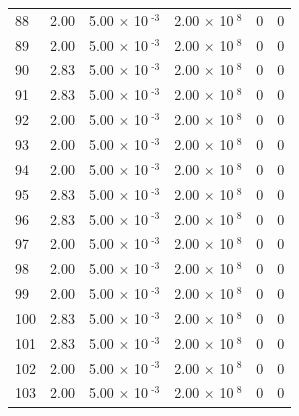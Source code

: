 \documentclass[a4paper,11pt]{article}
\begin{document}
\begin{center}
\begin{longtable}{|R{1.5cm}|R{2.4cm}|R{2.4cm}|R{2.4cm}|R{2.4cm}|R{2.4cm}|}
   88 &   2.00  &         5.00 $\times$ 10$^{\text{          -3}}$  &         2.00 $\times$ 10$^{\text{           8}}$  & 0  & 0 \\
   89 &   2.00  &         5.00 $\times$ 10$^{\text{          -3}}$  &         2.00 $\times$ 10$^{\text{           8}}$  & 0  & 0 \\
   90 &   2.83  &         5.00 $\times$ 10$^{\text{          -3}}$  &         2.00 $\times$ 10$^{\text{           8}}$  & 0  & 0 \\
   91 &   2.83  &         5.00 $\times$ 10$^{\text{          -3}}$  &         2.00 $\times$ 10$^{\text{           8}}$  & 0  & 0 \\
   92 &   2.00  &         5.00 $\times$ 10$^{\text{          -3}}$  &         2.00 $\times$ 10$^{\text{           8}}$  & 0  & 0 \\
   93 &   2.00  &         5.00 $\times$ 10$^{\text{          -3}}$  &         2.00 $\times$ 10$^{\text{           8}}$  & 0  & 0 \\
   94 &   2.00  &         5.00 $\times$ 10$^{\text{          -3}}$  &         2.00 $\times$ 10$^{\text{           8}}$  & 0  & 0 \\
   95 &   2.83  &         5.00 $\times$ 10$^{\text{          -3}}$  &         2.00 $\times$ 10$^{\text{           8}}$  & 0  & 0 \\
   96 &   2.83  &         5.00 $\times$ 10$^{\text{          -3}}$  &         2.00 $\times$ 10$^{\text{           8}}$  & 0  & 0 \\
   97 &   2.00  &         5.00 $\times$ 10$^{\text{          -3}}$  &         2.00 $\times$ 10$^{\text{           8}}$  & 0  & 0 \\
   98 &   2.00  &         5.00 $\times$ 10$^{\text{          -3}}$  &         2.00 $\times$ 10$^{\text{           8}}$  & 0  & 0 \\
   99 &   2.00  &         5.00 $\times$ 10$^{\text{          -3}}$  &         2.00 $\times$ 10$^{\text{           8}}$  & 0  & 0 \\
  100 &   2.83  &         5.00 $\times$ 10$^{\text{          -3}}$  &         2.00 $\times$ 10$^{\text{           8}}$  & 0  & 0 \\
  101 &   2.83  &         5.00 $\times$ 10$^{\text{          -3}}$  &         2.00 $\times$ 10$^{\text{           8}}$  & 0  & 0 \\
  102 &   2.00  &         5.00 $\times$ 10$^{\text{          -3}}$  &         2.00 $\times$ 10$^{\text{           8}}$  & 0  & 0 \\
  103 &   2.00  &         5.00 $\times$ 10$^{\text{          -3}}$  &         2.00 $\times$ 10$^{\text{           8}}$  & 0  & 0 \\

\end{longtable}
\end{center}
\end{document}
